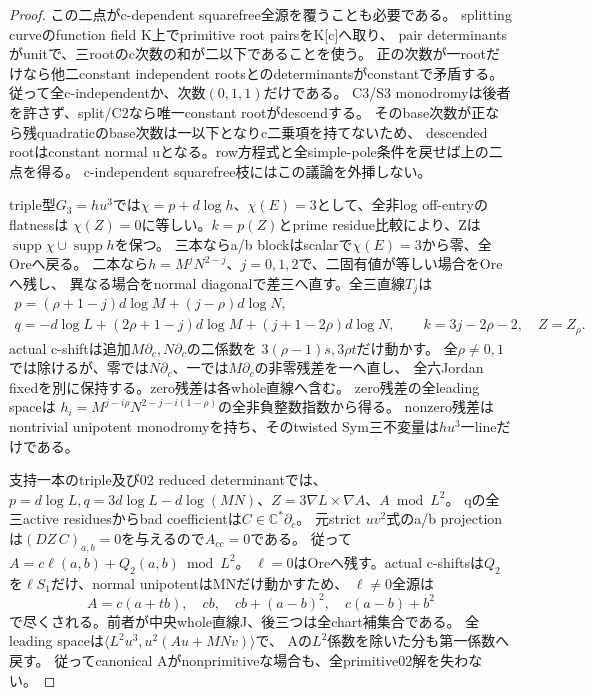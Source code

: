 \documentclass[a4paper,11pt]{ltjsarticle}
\theoremstyle{definition}
\begin{document}
\begin{proof}
この二点がc-dependent squarefree全源を覆うことも必要である。
splitting curveのfunction field K上でprimitive root pairsをK[c]へ取り、
pair determinantsがunitで、三rootのc次数の和が二以下であることを使う。
正の次数が一rootだけなら他二constant independent rootsとのdeterminantsがconstantで矛盾する。
従って全c-independentか、次数$(0,1,1)$だけである。
C3/S3 monodromyは後者を許さず、split/C2なら唯一constant rootがdescendする。
そのbase次数が正なら残quadraticのbase次数は一以下となりc二乗項を持てないため、
descended rootはconstant normal uとなる。row方程式と全simple-pole条件を戻せば上の二点を得る。
c-independent squarefree枝にはこの議論を外挿しない。

triple型$G_3=hu^3$では$\chi=p+d\log h$、$\chi(E)=3$として、全非log off-entryのflatnessは
$\chi(Z)=0$に等しい。$k=p(Z)$とprime residue比較により、Zは$\operatorname{supp}\chi\cup\operatorname{supp}h$を保つ。
三本ならa/b blockはscalarで$\chi(E)=3$から零、全Oreへ戻る。
二本なら$h=M^jN^{2-j}$、$j=0,1,2$で、二固有値が等しい場合をOreへ残し、
異なる場合をnormal diagonalで差三へ直す。全三直線$T_j$は
\[
\begin{gathered}
 p=(\rho+1-j)d\log M+(j-\rho)d\log N,\\
 q=-d\log L+(2\rho+1-j)d\log M+(j+1-2\rho)d\log N,
 \qquad k=3j-2\rho-2,\quad Z=Z_\rho.
\end{gathered}
\]
actual c-shiftは追加$M\partial_c,N\partial_c$の二係数を
$3(\rho-1)s,3\rho t$だけ動かす。
全$\rho\ne0,1$では除けるが、零では$N\partial_c$、一では$M\partial_c$の非零残差を一へ直し、
全六Jordan fixedを別に保持する。zero残差は各whole直線へ含む。
zero残差の全leading spaceは
$h_i=M^{j-i\rho}N^{2-j-i(1-\rho)}$の全非負整数指数から得る。
nonzero残差はnontrivial unipotent monodromyを持ち、そのtwisted Sym三不変量は$hu^3$一lineだけである。

支持一本のtriple及び02 reduced determinantでは、
$p=d\log L,q=3d\log L-d\log(MN)$、$Z=3\nabla L\times\nabla A$、$A\bmod L^2$。
qの全三active residuesからbad coefficientは$C\in\mathbb C^*\partial_c$。
元strict $uv^2$式のa/b projectionは$(DZ\,C)_{a,b}=0$を与えるので$A_{cc}=0$である。
従って$A=c\ell(a,b)+Q_2(a,b)\bmod L^2$。
$\ell=0$はOreへ残す。actual c-shiftsは$Q_2$を$\ell S_1$だけ、normal unipotentはMNだけ動かすため、
$\ell\ne0$全源は
\[
 A=c(a+tb),\quad cb,\quad cb+(a-b)^2,\quad c(a-b)+b^2
\]
で尽くされる。前者が中央whole直線J、後三つは全chart補集合である。
全leading spaceは$\langle L^2u^3,u^2(Au+MNv)\rangle$で、
Aの$L^2$係数を除いた分も第一係数へ戻す。
従ってcanonical Aがnonprimitiveな場合も、全primitive02解を失わない。


\end{proof}
\end{document}
